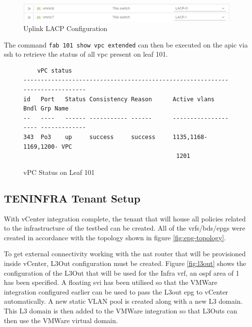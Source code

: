 \begin{figure}[H]
    
    \centering
    \includegraphics[scale=0.7]{images/lacp-interface-assignment.png}
    
    \caption{Uplink LACP Configuration}
    \label{fig:uplink-lacp}
\end{figure}
The command \verb|fab 101 show vpc extended| can then be executed on the \gls{apic} via \gls{ssh} to retrieve the status of all \gls{vpc} present on leaf 101.
\begin{figure}[H]
    \begin{small}
        \begin{verbatim}
    vPC status
-----------------------------------------------------------------------------
id   Port   Status Consistency Reason      Active vlans         Bndl Grp Name
--   ----   ------ ----------- ------      -------------------- -------------
343  Po3    up     success     success     1135,1168-1169,1200- VPC
                                            1201

    \end{verbatim}
    \end{small}
    \caption{vPC Status on Leaf 101}
    \label{fig:vpc-status}
\end{figure}


\subsection{TEN\textunderscore INFRA Tenant Setup}
With vCenter integration complete, the tenant that will house all policies related to the infrastructure of the testbed can be created. All of the \gls{vrf}s/\gls{bd}s/\gls{epg}s were created in accordance with the topology shown in figure \ref{fig:epg-topology}.

To get external connectivity working with the \gls{nat} router that will be provisioned inside vCenter, L3Out configuration must be created. Figure \ref{fig:l3out} shows the configuration of the L3Out that will be used for the Infra \gls{vrf}, an \gls{ospf} area of 1 has been specified. A floating \gls{svi} has been utilised so that the VMWare integration configured earlier can be used to pass the L3out \gls{epg} to vCenter automatically. A new static VLAN pool is created along with a new L3 domain. This L3 domain is then added to the VMWare integration so that L3Outs can then use the VMWare virtual domain.

